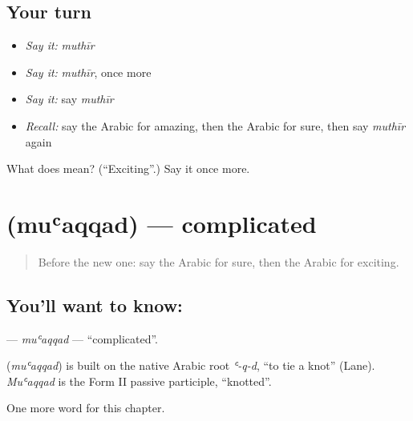 \subsection*{Your turn}
\begin{itemize}
\raggedright
  \item \emph{Say it:} \emph{muthīr}
  \item \emph{Say it:} \emph{muthīr}, once more
  \item \emph{Say it:} say \emph{muthīr}
  \item \emph{Recall:} say the Arabic for amazing, then the Arabic for sure, then say \emph{muthīr} again
\end{itemize}

\begin{tcolorbox}[breakable,colback=teal!4,colframe=teal!35!black,title={Before you move on}]
What does  mean? (\textquotedblleft{}Exciting\textquotedblright{}.) Say it once more.
\end{tcolorbox}
\section[\texorpdfstring{\ar{معقد} (muʿaqqad)}{معقد (muʿaqqad)}]{ (muʿaqqad) — complicated}

\label{lesson:AR-C272-muaqqad}



\begin{quote}
Before the new one: say the Arabic for sure, then the Arabic for exciting.
\end{quote}

\subsection*{You'll want to know: }
\textbf{} — \emph{muʿaqqad} — \textquotedblleft{}complicated\textquotedblright{}.

\begin{cousinweb}
\textbf{} (\emph{muʿaqqad}) is built on the native Arabic root \emph{ʿ-q-d}, \textquotedblleft{}to tie a knot\textquotedblright{} (Lane). \emph{Muʿaqqad} is the Form II passive participle, \textquotedblleft{}knotted\textquotedblright{}.
\end{cousinweb}

\begin{grammarlens}[title={What you've built}]
One more word for this chapter.
\end{grammarlens}

